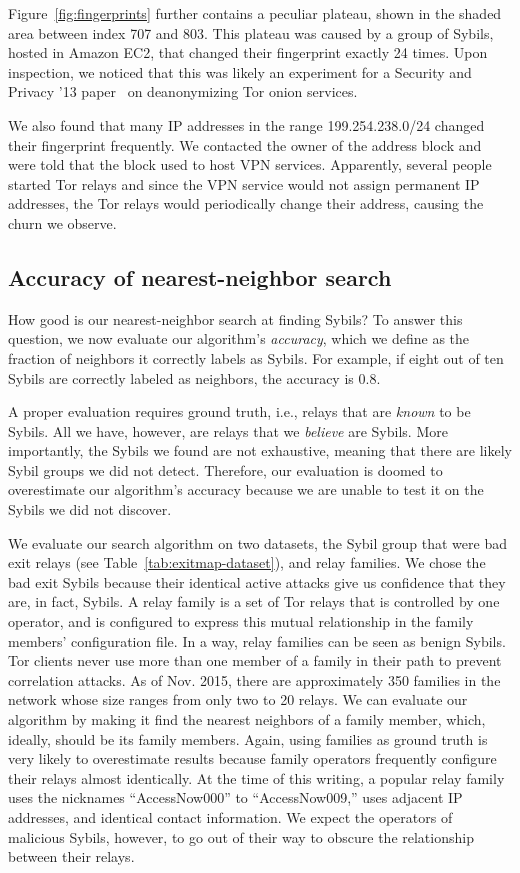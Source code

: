 Figure~\ref{fig:fingerprints} further contains a peculiar plateau, shown in the
shaded area between index 707 and 803.  This plateau was caused by a group of
Sybils, hosted in Amazon EC2, that changed their fingerprint exactly 24 times.
Upon inspection, we noticed that this was likely an experiment for a Security
and Privacy '13 paper~\cite{Biryukov2013a} on deanonymizing Tor onion services.

We also found that many IP addresses in the range 199.254.238.0/24 changed their
fingerprint frequently.  We contacted the owner of the address block and were
told that the block used to host VPN services.  Apparently, several people
started Tor relays and since the VPN service would not assign permanent IP
addresses, the Tor relays would periodically change their address, causing the
churn we observe.

\subsection{Accuracy of nearest-neighbor search}
\label{sec:accuracy}
How good is our nearest-neighbor search at finding Sybils?  To answer this
question, we now evaluate our algorithm's \emph{accuracy}, which we define as
the fraction of neighbors it correctly labels as Sybils.  For example, if eight
out of ten Sybils are correctly labeled as neighbors, the accuracy is 0.8.

A proper evaluation requires ground truth, i.e., relays that are \emph{known} to
be Sybils.  All we have, however, are relays that we \emph{believe} are Sybils.
More importantly, the Sybils we found are not exhaustive, meaning that there are
likely Sybil groups we did not detect.  Therefore, our evaluation is doomed to
overestimate our algorithm's accuracy because we are unable to test it on the
Sybils we did not discover.

We evaluate our search algorithm on two datasets, the Sybil group that were
bad exit relays (see Table~\ref{tab:exitmap-dataset}), and relay families.  We
chose the bad exit Sybils because their identical active attacks give us
confidence that they are, in fact, Sybils.  A relay family is a set of Tor
relays that is controlled by one operator, and is configured to express this
mutual relationship in the family members' configuration file.  In a way, relay
families can be seen as benign Sybils.  Tor clients never use more than one
member of a family in their path to prevent correlation attacks.  As of Nov.
2015, there are approximately 350 families in the network whose size ranges from
only two to 20 relays.  We can evaluate our algorithm by making it find the
nearest neighbors of a family member, which, ideally, should be its family
members.  Again, using families as ground truth is very likely to overestimate
results because family operators frequently configure their relays almost
identically.  At the time of this writing, a popular relay family uses the
nicknames ``AccessNow000'' to ``AccessNow009,'' uses adjacent IP addresses, and
identical contact information.  We expect the operators of malicious Sybils,
however, to go out of their way to obscure the relationship between their
relays.

